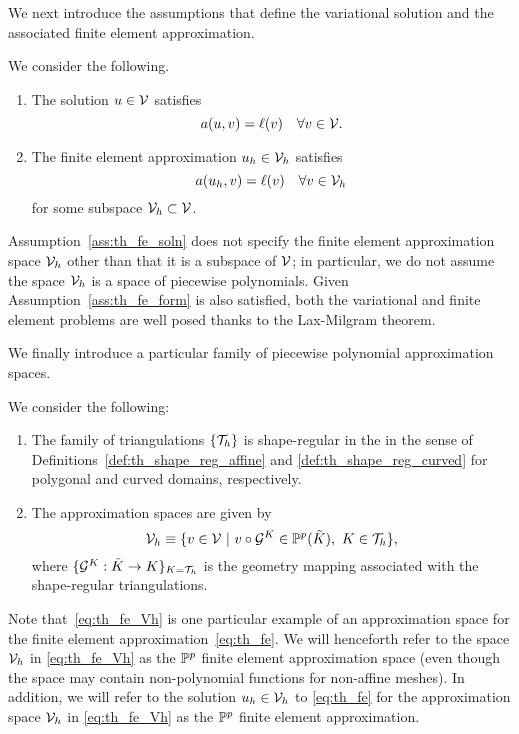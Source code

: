 We next introduce the assumptions that define the variational solution and the associated finite element approximation.
\begin{assumption}
  \label{ass:th_fe_soln}
  We consider the following.
  \begin{enumerate}
  \item The solution $u \in \mathcal{V}$ satisfies
    \begin{equation}
      \label{eq:th_pde}
      a(u,v) = \ell(v) \quad \forall v \in \mathcal{V}.
    \end{equation}
  \item The finite element approximation $u_h \in \mathcal{V}_h$ satisfies
    \begin{equation}
      \label{eq:th_fe}
      a(u_h,v) = \ell(v) \quad \forall v \in \mathcal{V}_h
    \end{equation}
    for some subspace $\mathcal{V}_h \subset \mathcal{V}$.
  \end{enumerate}
\end{assumption}
Assumption~\ref{ass:th_fe_soln} does not specify the finite element approximation space $\mathcal{V}_h$ other than that it is a subspace of $\mathcal{V}$; in particular, we do not assume the space $\mathcal{V}_h$ is a space of piecewise polynomials.  Given Assumption~\ref{ass:th_fe_form} is also satisfied, both the variational and finite element problems are well posed thanks to the Lax-Milgram theorem.

We finally introduce a particular family of piecewise polynomial approximation spaces.
\begin{assumption}
  \label{ass:th_fe_Vh}
  We consider the following:
  \begin{enumerate}
  \item The family of triangulations $\{ \mathcal{T}_h \}$ is shape-regular in the in the sense of Definitions~\ref{def:th_shape_reg_affine} and \ref{def:th_shape_reg_curved} for polygonal and curved domains, respectively.
  \item The approximation spaces are given by 
  \begin{equation}
    \mathcal{V}_h \equiv \{ v \in \mathcal{V} \ | \ v \circ \mathcal{G}^K \in \mathbb{P}^p(\tilde K), \ K \in \mathcal{T}_h \},
    \label{eq:th_fe_Vh}
  \end{equation}
  where $\{ \mathcal{G}^K: \tilde K \to K \}_{K = \mathcal{T}_h}$ is the geometry mapping associated with the shape-regular triangulations.
  \end{enumerate}
  \end{assumption}
  Note that~\eqref{eq:th_fe_Vh} is one particular example of an approximation space for the finite element approximation~\eqref{eq:th_fe}.  We will henceforth refer to the space $\mathcal{V}_h$ in \eqref{eq:th_fe_Vh} as the $\mathbb{P}^p$ finite element approximation space (even though the space may contain non-polynomial functions for non-affine meshes). In addition, we will refer to the solution $u_h \in \mathcal{V}_h$ to \eqref{eq:th_fe} for the approximation space $\mathcal{V}_h$ in \eqref{eq:th_fe_Vh} as the $\mathbb{P}^p$ finite element approximation.  

